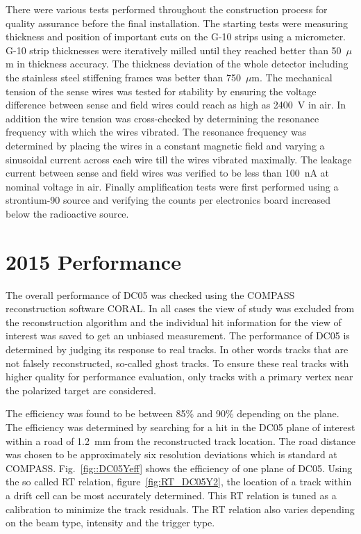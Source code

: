 There were various tests performed throughout the construction process for
quality assurance before the final installation.  The starting tests were
measuring thickness and position of important cuts on the G-10 strips using a
micrometer.  G-10 strip thicknesses were iteratively milled until they reached
better than 50~$\mu$m in thickness accuracy.  The thickness deviation of the
whole detector including the stainless steel stiffening frames was better than
750~$\mu$m.  The mechanical tension of the sense wires was tested for stability
by ensuring the voltage difference between sense and field wires could reach as
high as 2400~V in air.  In addition the wire tension was cross-checked by
determining the resonance frequency with which the wires vibrated.  The
resonance frequency was determined by placing the wires in a constant magnetic
field and varying a sinusoidal current across each wire till the wires vibrated
maximally.  The leakage current between sense and field wires was verified to be
less than 100~nA at nominal voltage in air.  Finally amplification tests were
first performed using a strontium-90 source and verifying the counts per
electronics board increased below the radioactive source.


\section{2015 Performance}

The overall performance of DC05 was checked using the COMPASS reconstruction
software CORAL.  In all cases the view of study was excluded from the
reconstruction algorithm and the individual hit information for the view of
interest was saved to get an unbiased measurement.  The performance of DC05 is
determined by judging its response to real tracks.  In other words tracks that
are not falsely reconstructed, so-called ghost tracks.  To ensure these real
tracks with higher quality for performance evaluation, only tracks with a
primary vertex near the polarized target are considered.

The efficiency was found to be between 85\% and 90\% depending on the plane.
The efficiency was determined by searching for a hit in the DC05 plane of
interest within a road of 1.2~mm from the reconstructed track location.  The
road distance was chosen to be approximately six resolution deviations which is
standard at COMPASS.  Fig.~\ref{fig::DC05Yeff} shows the efficiency of one plane
of DC05.  Using the so called RT relation, figure~\ref{fig:RT_DC05Y2}, the
location of a track within a drift cell can be most accurately determined.  This
RT relation is tuned as a calibration to minimize the track residuals.  The RT
relation also varies depending on the beam type, intensity and the trigger type.

